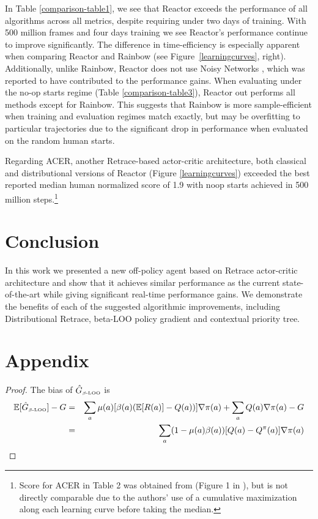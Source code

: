 \documentclass{article}
\newcommand{\beqan}{\begin{eqnarray*}}
\newcommand{\eeqan}{\end{eqnarray*}}
\newcommand{\E}{{\mathbb E}}
\begin{document}
In Table \ref{comparison-table1}, we see that Reactor exceeds the performance of all algorithms across all metrics, 
despite requiring under two days of training. With 500 million frames and four days training we see Reactor's performance 
continue to improve significantly. The difference in time-efficiency is especially apparent when 
comparing Reactor and Rainbow (see Figure~\ref{learningcurves}, right).
Additionally, unlike Rainbow, Reactor does not use Noisy Networks 
\citep{fortunato2017noisy}, which was reported to have contributed 
to the performance gains. When evaluating under the no-op starts regime (Table \ref{comparison-table3}), 
Reactor out performs all methods except for Rainbow. This suggests that Rainbow is more sample-efficient
when training and evaluation regimes match exactly, but may be overfitting to particular trajectories due to 
the significant drop in performance when evaluated on the random human starts.

Regarding ACER, another Retrace-based actor-critic 
architecture, both classical and distributional versions of Reactor (Figure 
\ref{learningcurves}) exceeded the best 
reported median human normalized score of 1.9 with noop starts achieved in 500 
million steps.\footnote{
  \label{acerfootnote}
  Score for ACER in Table 2 was obtained from (Figure 1 in 
  \cite{wang2017sample}), but is not directly comparable due to the authors' 
  use of a cumulative maximization along each learning curve before taking the median.
}
\section{Conclusion}
In this work we presented a new off-policy agent based on Retrace actor-critic 
architecture and show that it achieves similar performance as the 
current state-of-the-art while giving significant real-time performance gains. 
We demonstrate the benefits of each of the suggested algorithmic improvements, 
including Distributional Retrace, beta-LOO policy gradient and contextual 
priority tree.



\normalsize

\onecolumn

\section{Appendix}

\propbias*
\begin{proof}
The bias of $\hat G_{\mbox{\tiny $\beta$-LOO}}$ is
\beqan
\E[\hat G_{\mbox{\tiny $\beta$-LOO}}] - G &=& \sum_a \mu(a) [ \beta(a) (\E[R(a)] -Q(a)) ] \nabla\pi(a) + \sum_{a} Q(a) \nabla\pi(a) - G\\
&=& \sum_a (1-\mu(a)\beta(a)) [Q(a)-Q^{\pi}(a)] \nabla\pi(a)
\eeqan
\end{proof}
\end{document}
